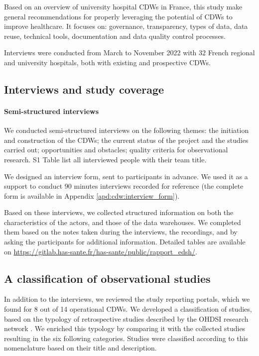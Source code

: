 \documentclass[french,12pt,twoside,a4paper]{book}
\begin{document}
Based on an overview of university hospital CDWs in France, this study make
general recommendations for properly leveraging the potential of CDWs to improve
healthcare. It focuses on: governance, transparency, types of
data, data reuse, technical tools, documentation and data quality control
processes.

Interviews were conducted from March to November 2022 with 32 French regional
and university hospitals, both with existing and prospective CDWs.

\subsection{Interviews and study coverage}\label{subsec:cdw:interviews}

\paragraph{Semi-structured interviews}

We conducted semi-structured interviews on the following themes: the initiation
and construction of the CDWs; the current status of the project and the studies
carried out; opportunities and obstacles; quality criteria for observational
research. S1 Table list all interviewed people with their team title.

We designed an interview form, sent to participants in advance. We used it as a
support to conduct 90 minutes interviews recorded for reference (the complete
form is available in Appendix \ref{apd:cdw:interview_form}).

Based on these interviews, we collected structured information on both the
characteristics of the actors, and those of the data warehouses. We completed
them based on the notes taken during the interviews, the recordings, and by
asking the participants for additional information. Detailed tables are
available on \url{https://gitlab.has-sante.fr/has-sante/public/rapport_edsh/}.

\subsection{A classification of observational studies}%
\label{subsec:cdw:classification}%

In addition to the interviews, we reviewed the study reporting portals, which we
found for 8 out of 14 operational CDWs. We developed a classification of
studies, based on the typology of retrospective studies described by the OHDSI
research network \citep{schuemie_book_2021}. We enriched this typology by
comparing it with the collected studies resulting in the six following
categories. Studies were classified according to this nomenclature based on
their title and description.
\end{document}
